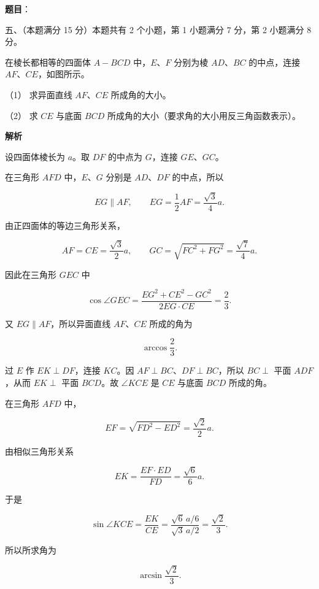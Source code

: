 \begin{answer}

\textbf{题目}：

五、（本题满分 15 分）本题共有 2 个小题，第 1 小题满分 7 分，第 2 小题满分 8 分。

在棱长都相等的四面体 $A-BCD$ 中，$E\text{、}F$ 分别为棱 $AD\text{、}BC$ 的中点，连接 $AF\text{、}CE$，如图所示。
\nopagebreak[4]
\begin{center}\end{center}
\nopagebreak[4]
（1） 求异面直线 $AF\text{、}CE$ 所成角的大小。

（2） 求 $CE$ 与底面 $BCD$ 所成角的大小（要求角的大小用反三角函数表示）。

\textbf{解析}

设四面体棱长为 $a$。取 $DF$ 的中点为 $G$，连接 $GE$、$GC$。


在三角形 $AFD$ 中，$E$、$G$ 分别是 $AD$、$DF$ 的中点，所以

\nopagebreak[4]
\[
EG\parallel AF,\qquad EG=\frac12AF=\frac{\sqrt3}{4}a.
\]

由正四面体的等边三角形关系，

\nopagebreak[4]
\[
AF=CE=\frac{\sqrt3}{2}a,\qquad
GC=\sqrt{FC^2+FG^2}=\frac{\sqrt7}{4}a.
\]

因此在三角形 $GEC$ 中

\nopagebreak[4]
\[
\cos\angle GEC
=\frac{EG^2+CE^2-GC^2}{2EG\cdot CE}
=\frac23.
\]

又 $EG\parallel AF$，所以异面直线 $AF\text{、}CE$ 所成的角为

\nopagebreak[4]
\[
\arccos\frac23.
\]


过 $E$ 作 $EK\perp DF$，连接 $KC$。因 $AF\perp BC$、$DF\perp BC$，所以 $BC\perp$ 平面 $ADF$，从而 $EK\perp$ 平面 $BCD$。故 $\angle KCE$ 是 $CE$ 与底面 $BCD$ 所成的角。

在三角形 $AFD$ 中，

\nopagebreak[4]
\[
EF=\sqrt{FD^2-ED^2}=\frac{\sqrt2}{2}a.
\]

由相似三角形关系

\nopagebreak[4]
\[
EK=\frac{EF\cdot ED}{FD}=\frac{\sqrt6}{6}a.
\]

于是

\nopagebreak[4]
\[
\sin\angle KCE=\frac{EK}{CE}
=\frac{\sqrt6\,a/6}{\sqrt3\,a/2}
=\frac{\sqrt2}{3}.
\]

所以所求角为

\nopagebreak[4]
\[
\arcsin\frac{\sqrt2}{3}.
\]



\end{answer}
